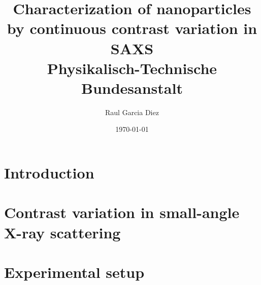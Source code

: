 \documentclass[12pt]{report}
\title{
	{Characterization of nanoparticles by continuous contrast variation in SAXS}\\
	{\large Physikalisch-Technische Bundesanstalt}\\
}
\author{Raul Garcia Diez}
\date{\today}
\begin{document}
	\maketitle
	\tableofcontents
	
	\chapter{Introduction}
	
	
	\chapter{Contrast variation in small-angle X-ray scattering}
	
	
	\chapter{Experimental setup}
	
	
\end{document}
